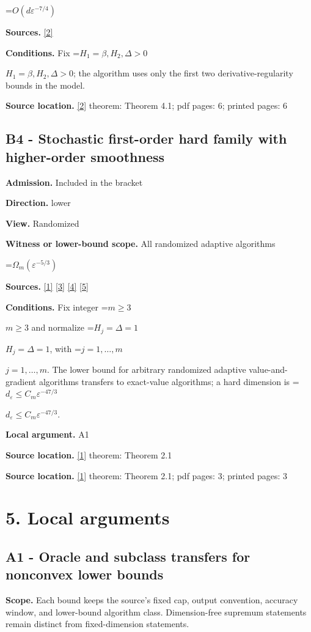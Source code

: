 \documentclass[10pt,a4paper]{article}
\newcommand{\AtlasMath}[1]{\par\begingroup\centering\setbox0=\hbox{$\displaystyle #1$}\ifdim\wd0>1.4\linewidth\typeout{ATLAS WIDE FORMULA: \the\wd0}\fi\ifdim\wd0>\linewidth\resizebox{\linewidth}{!}{\box0}\else\box0\fi\par\endgroup}
\newcommand{\AtlasInlineMath}[1]{\begingroup\setbox0=\hbox{$#1$}\ifdim\wd0>.4\linewidth\endgroup\AtlasMath{#1}\else\endgroup$#1$\fi}
\begin{document}
\AtlasMath{O(d\varepsilon^{-7/4})}
\textbf{Sources.} \href{https://proceedings.mlr.press/v235/he24h.html}{[2]}

\textbf{Conditions.} Fix \AtlasInlineMath{H_1=\beta,H_2,\Delta>0}; the algorithm uses only the first two derivative-regularity bounds in the model.

\textbf{Source location.} \href{https://proceedings.mlr.press/v235/he24h.html}{[2]} theorem: Theorem 4.1; pdf pages: 6; printed pages: 6

\subsection{B4 - Stochastic first-order hard family with higher-order smoothness}
\textbf{Admission.} Included in the bracket

\textbf{Direction.} lower

\textbf{View.} Randomized

\textbf{Witness or lower-bound scope.} All randomized adaptive algorithms

\AtlasMath{\Omega_m(\varepsilon^{-5/3})}
\textbf{Sources.} \href{https://arxiv.org/html/2610.17074v1}{[1]} \href{https://arxiv.org/html/2610.19652v1}{[3]} \href{https://arxiv.org/html/2609.00045v3}{[4]} \href{https://arxiv.org/pdf/2610.00245v2}{[5]}

\textbf{Conditions.} Fix integer \AtlasInlineMath{m\ge3} and normalize \AtlasInlineMath{H_j=\Delta=1}, with \AtlasInlineMath{j=1,\ldots,m}. The lower bound for arbitrary randomized adaptive value-and-gradient algorithms transfers to exact-value algorithms; a hard dimension is \AtlasInlineMath{d_\varepsilon\le C_m\varepsilon^{-47/3}}.

\textbf{Local argument.} A1

\textbf{Source location.} \href{https://arxiv.org/html/2610.17074v1}{[1]} theorem: Theorem 2.1

\textbf{Source location.} \href{https://arxiv.org/html/2610.17074v1}{[1]} theorem: Theorem 2.1; pdf pages: 3; printed pages: 3

\section{5. Local arguments}
\subsection{A1 - Oracle and subclass transfers for nonconvex lower bounds}
\textbf{Scope.} Each bound keeps the source's fixed cap, output convention, accuracy window, and lower-bound algorithm class. Dimension-free supremum statements remain distinct from fixed-dimension statements.
\end{document}
